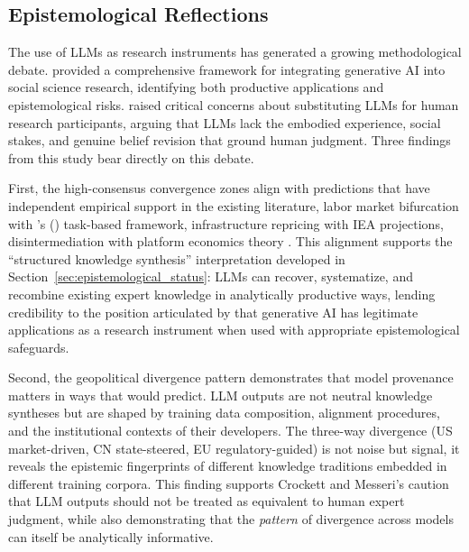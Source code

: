\documentclass[preprint,review,12pt]{elsarticle}
\begin{document}
\subsection{Epistemological Reflections}
\label{sec:epistemological_reflections}

The use of LLMs as research instruments has generated a growing methodological debate. \citet{bail2024genaisocialscience} provided a comprehensive framework for integrating generative AI into social science research, identifying both productive applications and epistemological risks. \citet{crockett2024llmparticipants} raised critical concerns about substituting LLMs for human research participants, arguing that LLMs lack the embodied experience, social stakes, and genuine belief revision that ground human judgment. Three findings from this study bear directly on this debate.

First, the high-consensus convergence zones align with predictions that have independent empirical support in the existing literature, labor market bifurcation with \citeauthor{acemoglu2019automation}'s (\citeyear{acemoglu2019automation}) task-based framework, infrastructure repricing with IEA projections, disintermediation with platform economics theory \citep{goldfarb2019digital}. This alignment supports the ``structured knowledge synthesis'' interpretation developed in Section~\ref{sec:epistemological_status}: LLMs can recover, systematize, and recombine existing expert knowledge in analytically productive ways, lending credibility to the position articulated by \citet{bail2024genaisocialscience} that generative AI has legitimate applications as a research instrument when used with appropriate epistemological safeguards.

Second, the geopolitical divergence pattern demonstrates that model provenance matters in ways that \citet{crockett2024llmparticipants} would predict. LLM outputs are not neutral knowledge syntheses but are shaped by training data composition, alignment procedures, and the institutional contexts of their developers. The three-way divergence (US market-driven, CN state-steered, EU regulatory-guided) is not noise but signal, it reveals the epistemic fingerprints of different knowledge traditions embedded in different training corpora. This finding supports Crockett and Messeri's caution that LLM outputs should not be treated as equivalent to human expert judgment, while also demonstrating that the \textit{pattern} of divergence across models can itself be analytically informative.
\end{document}
